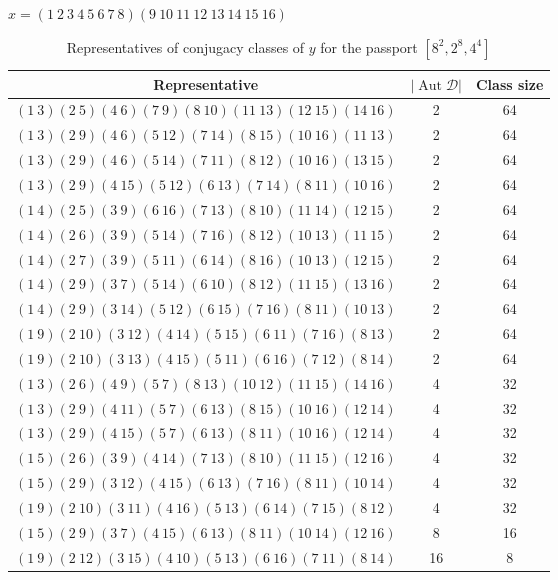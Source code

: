 \documentclass[12pt,reqno]{amsart}
\newcommand{\msD}{\mathscr{D}}
\newcommand{\HL}{\vspace{2mm}}							%
\newcommand{\vt}[1]{\left\lvert #1 \right\rvert}					%
\DeclareMathOperator{\Aut}{Aut}							%
\theoremstyle{mythmstyle}
\theoremstyle{mydefstyle}
\newcommand{\AD}{\Aut{\msD}}
\numberwithin{equation}{section}
\begin{document}
\begin{table}[htbp]
\centering
\small
$x = (1\ 2\ 3\ 4\ 5\ 6\ 7\ 8)(9\ 10\ 11\ 12\ 13\ 14\ 15\ 16)$ \\
\HL
\begin{tabular}{|c|c|c|}
\hline
Representative & $\vt{\AD}$ & Class size \\
\hline
$(1\ 3)(2\ 5)(4\ 6)(7\ 9)(8\ 10)(11\ 13)(12\ 15)(14\ 16)$ & 2 & 64 \\
\hline
$(1\ 3)(2\ 9)(4\ 6)(5\ 12)(7\ 14)(8\ 15)(10\ 16)(11\ 13)$ & 2 & 64 \\
\hline
$(1\ 3)(2\ 9)(4\ 6)(5\ 14)(7\ 11)(8\ 12)(10\ 16)(13\ 15)$ & 2 & 64 \\
\hline
$(1\ 3)(2\ 9)(4\ 15)(5\ 12)(6\ 13)(7\ 14)(8\ 11)(10\ 16)$ & 2 & 64 \\
\hline
$(1\ 4)(2\ 5)(3\ 9)(6\ 16)(7\ 13)(8\ 10)(11\ 14)(12\ 15)$ & 2 & 64 \\
\hline
$(1\ 4)(2\ 6)(3\ 9)(5\ 14)(7\ 16)(8\ 12)(10\ 13)(11\ 15)$ & 2 & 64 \\
\hline
$(1\ 4)(2\ 7)(3\ 9)(5\ 11)(6\ 14)(8\ 16)(10\ 13)(12\ 15)$ & 2 & 64 \\
\hline
$(1\ 4)(2\ 9)(3\ 7)(5\ 14)(6\ 10)(8\ 12)(11\ 15)(13\ 16)$ & 2 & 64 \\
\hline
$(1\ 4)(2\ 9)(3\ 14)(5\ 12)(6\ 15)(7\ 16)(8\ 11)(10\ 13)$ & 2 & 64 \\
\hline
$(1\ 9)(2\ 10)(3\ 12)(4\ 14)(5\ 15)(6\ 11)(7\ 16)(8\ 13)$ & 2 & 64 \\
\hline
$(1\ 9)(2\ 10)(3\ 13)(4\ 15)(5\ 11)(6\ 16)(7\ 12)(8\ 14)$ & 2 & 64 \\
\hline
$(1\ 3)(2\ 6)(4\ 9)(5\ 7)(8\ 13)(10\ 12)(11\ 15)(14\ 16)$ & 4 & 32 \\
\hline
$(1\ 3)(2\ 9)(4\ 11)(5\ 7)(6\ 13)(8\ 15)(10\ 16)(12\ 14)$ & 4 & 32 \\
\hline
$(1\ 3)(2\ 9)(4\ 15)(5\ 7)(6\ 13)(8\ 11)(10\ 16)(12\ 14)$ & 4 & 32 \\
\hline
$(1\ 5)(2\ 6)(3\ 9)(4\ 14)(7\ 13)(8\ 10)(11\ 15)(12\ 16)$ & 4 & 32 \\
\hline
$(1\ 5)(2\ 9)(3\ 12)(4\ 15)(6\ 13)(7\ 16)(8\ 11)(10\ 14)$ & 4 & 32 \\
\hline
$(1\ 9)(2\ 10)(3\ 11)(4\ 16)(5\ 13)(6\ 14)(7\ 15)(8\ 12)$ & 4 & 32 \\
\hline
$(1\ 5)(2\ 9)(3\ 7)(4\ 15)(6\ 13)(8\ 11)(10\ 14)(12\ 16)$ & 8 & 16 \\
\hline
$(1\ 9)(2\ 12)(3\ 15)(4\ 10)(5\ 13)(6\ 16)(7\ 11)(8\ 14)$ & 16 & 8 \\
\hline
\end{tabular}
\HL
\caption{Representatives of conjugacy classes of $y$ for the passport $[8^{2}, 2^{8}, 4^{4}]$}\label{tab:pass442882}
\end{table}
\end{document}

